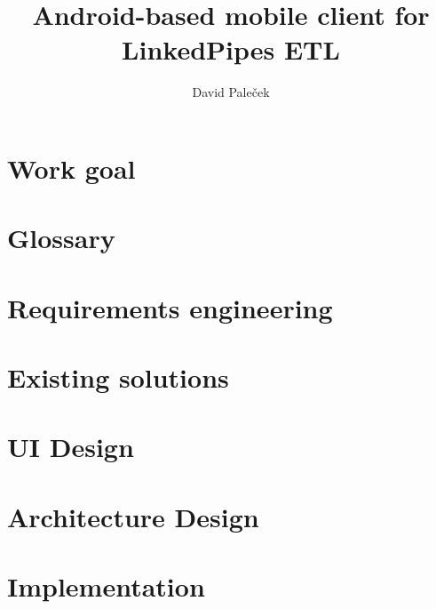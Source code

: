 \documentclass[thesis=B,english]{FITthesis}[2019/12/23]
\title{Android-based mobile client for LinkedPipes ETL}
\author{David Paleček} %
\begin{document}

\begin{introduction}
	
\end{introduction}

\chapter*{Work goal}


\chapter*{Glossary}
\begin{description}
	
\end{description}

\chapter{Requirements engineering}
\label{chap:requirementsengineering}
% 


\chapter{Existing solutions}
\label{chap:existingsolutions}


\chapter{UI Design}
\label{chap:uidesign}

\chapter{Architecture Design}
\label{chap:architecturedesign}


\chapter{Implementation}
\label{chap:implementation}
% 

\end{document}
